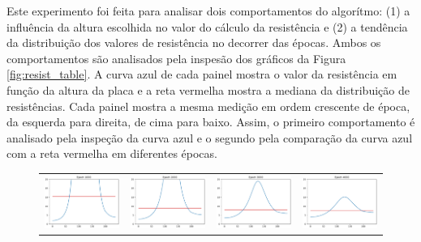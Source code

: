 \documentclass{aleph-revista}
\begin{document}
Este experimento foi feita para analisar dois comportamentos do algorítmo: (1) a influência da altura escolhida no valor do cálculo da resistência e (2) a tendência da distribuição dos valores de resistência no decorrer das épocas. Ambos os comportamentos são analisados pela inspesão dos gráficos da Figura \ref{fig:resist_table}. A curva azul de cada painel mostra o valor da resistência em função da altura da placa e a reta vermelha mostra a mediana da distribuição de resistências. Cada painel mostra a mesma medição em ordem crescente de época, da esquerda para direita, de cima para baixo. Assim, o primeiro comportamento é analisado pela inspeção da curva azul e o segundo pela comparação da curva azul com a reta vermelha em diferentes épocas.

\bigskip

\begin{figure}[!ht]
  \begin{tabular}{cccc}
    \includegraphics[width=0.22\linewidth]{res_1000}  &
    \includegraphics[width=0.22\linewidth]{res_2000}  &
    \includegraphics[width=0.22\linewidth]{res_3000}  &
    \includegraphics[width=0.22\linewidth]{res_4000}    \\


\end{tabular}
\end{figure}
\end{document}
